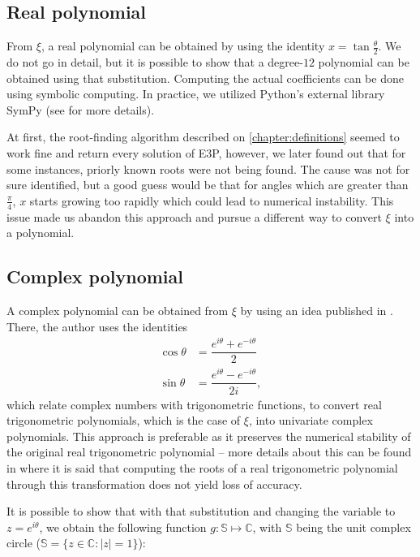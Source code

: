 \subsection{Real polynomial}

From $\xi$, a real polynomial can be obtained by using the identity $x = \tan{\frac{\theta}{2}}$. We do not go in detail, but it is possible to show that a degree-$12$ polynomial can be obtained using that substitution.
Computing the actual coefficients can be done using symbolic computing. In practice, we utilized Python's external library SymPy (see  for more details).

At first,  the root-finding algorithm described on \autoref{chapter:definitions} seemed to work fine and return every solution of E3P, however, we later found out that for some instances, priorly known roots were not being found. The cause was not for sure identified, but a good guess would be that for angles which are greater than $\frac{\pi}{4}$, $x$ starts growing too rapidly which could lead to numerical instability. This issue made us abandon this approach and pursue a different way to convert $\xi$ into a polynomial.

\subsection{Complex polynomial}

A complex polynomial can be obtained from $\xi$ by using an idea published in . There, the author uses the identities
\begin{align}\label{eq:complex_trig}
	\cos{\theta} &= \dfrac{e^{i\theta} + e^{-i\theta}}{2}\\
	\sin{\theta} &= \dfrac{e^{i\theta} - e^{-i\theta}}{2i},
\end{align}
which relate complex numbers with trigonometric functions, to convert real trigonometric polynomials, which is the case of $\xi$, into univariate complex polynomials.
This approach is preferable as it preserves the numerical stability of the original real trigonometric polynomial -- more details about this can be found in  where it is said that computing the roots of a real trigonometric polynomial through this transformation does not yield loss of accuracy.

It is possible to show that with that substitution and changing the variable to $z=e^{i\theta}$, we obtain the following function $g : \mathbb{S} \mapsto \mathbb{C}$, with $\mathbb{S}$ being the unit complex circle ($\mathbb{S} = \{z \in \mathbb{C} : |z|=1\}$):

